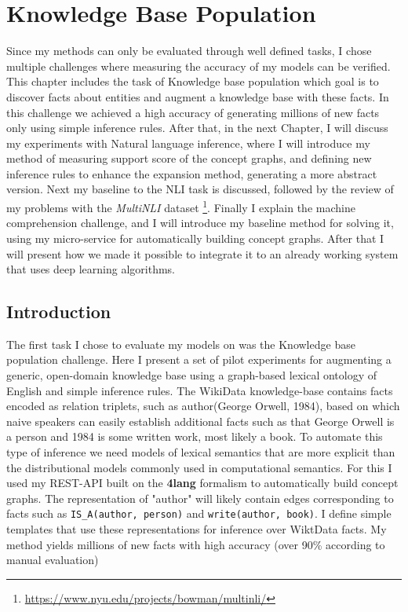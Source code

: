\chapter{Knowledge Base Population}
\label{chap:kbp}

Since my methods can only be evaluated through well defined tasks, I chose multiple challenges where measuring the accuracy of my models can be verified. This chapter includes the task of Knowledge base population which goal is to discover facts about entities and augment a knowledge base with these facts. In this challenge we achieved a high accuracy of generating millions of new facts only using simple inference rules. After that, in the next Chapter, I will discuss my experiments with Natural language inference, where I will introduce my method of measuring support score of the concept graphs, and defining new inference rules to enhance the expansion method, generating a more abstract version. Next my baseline to the NLI task is discussed, followed by the review of my problems with the \textit{MultiNLI} dataset \footnote{\url{https://www.nyu.edu/projects/bowman/multinli/}}. Finally I explain the machine comprehension challenge, and I will introduce my baseline method for solving it, using my micro-service for automatically building concept graphs. After that I will present how we made it possible to integrate it to an already working system that uses deep learning algorithms.

\section{Introduction} 
The first task I chose to evaluate my models on was the Knowledge base population challenge. Here I present a set of pilot experiments for augmenting a generic, open-domain 
knowledge base using a graph-based lexical ontology of English and simple
inference rules. The WikiData knowledge-base contains facts encoded as relation
triplets, such as author(George Orwell, 1984), based on which naive
speakers can easily establish additional facts such as that George Orwell is a
person and 1984 is some written work, most likely a book. To automate this type
of inference we need models of lexical semantics that are more explicit than
the distributional models commonly used in computational semantics. For this I used my REST-API built on the \textbf{4lang} formalism to automatically build concept graphs. The representation of "author" will likely contain edges
corresponding to facts such as \texttt{IS\_A(author, person)} and
\texttt{write(author, book)}.
I define simple templates that use these representations for inference over
WiktData facts. My method yields millions of new facts with high
accuracy (over 90\% according to manual evaluation)

